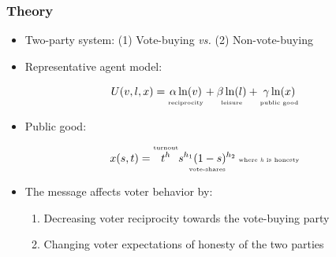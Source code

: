 \documentclass{beamer}
\begin{document}
\begin{frame}
\frametitle{Theory}

\begin{itemize}
\item Two-party system: (1) Vote-buying \textit{vs.} (2) Non-vote-buying 
\item Representative agent model: 
\end{itemize}

	\begin{equation*}
		U(v,l,x) = \underset{\text{\tiny{reciprocity}}}{\alpha \ln(v)} + \underset{\text{\tiny{leisure}}}{\beta \ln(l)} + %
		\underset{\text{\tiny{public good}}}{\gamma \ln(x)} 
	\end{equation*}

\begin{itemize}
\item Public good:	
\end{itemize}



\begin{equation*}
	x(s,t) = \overset{\text{\tiny{\\ turnout}}}{t^h} \underset{\text{\tiny{vote-shares}}}{s^{h_1}(1-s)^{h_2}} \tiny{\text{ where \textit{h} is honesty}}
\end{equation*}



\begin{itemize}
\item The message affects voter behavior by: 
	\begin{enumerate}
	\item Decreasing voter reciprocity towards the vote-buying party
	\item Changing voter expectations of honesty of the two parties
	\end{enumerate}
\end{itemize}

\end{frame}
\end{document}
